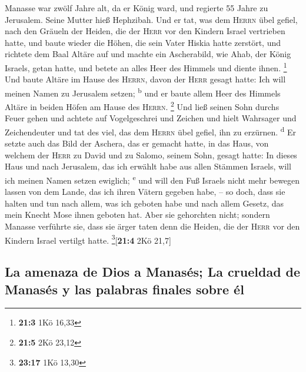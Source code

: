  Manasse war zwölf Jahre alt, da er König ward, und
regierte 55 Jahre zu Jerusalem. Seine Mutter hieß Hephzibah.
 Und er tat, was dem \textsc{Herrn} übel gefiel, nach den
Gräueln der Heiden, die der \textsc{Herr} vor den Kindern Israel
vertrieben hatte,  und baute wieder die Höhen, die sein
Vater Hiskia hatte zerstört, und richtete dem Baal Altäre auf und machte
ein Ascherabild, wie Ahab, der König Israels, getan hatte, und betete an
alles Heer des Himmels und diente ihnen. \footnote{\textbf{21:3} 1Kö
  16,33}  Und baute Altäre im Hause des \textsc{Herrn},
davon der \textsc{Herr} gesagt hatte: Ich will meinen Namen zu Jerusalem
setzen; \textsuperscript{b}  und er baute allem Heer des
Himmels Altäre in beiden Höfen am Hause des \textsc{Herrn}. \footnote{\textbf{21:5}
  2Kö 23,12}  Und ließ seinen Sohn durchs Feuer gehen und
achtete auf Vogelgeschrei und Zeichen und hielt Wahrsager und
Zeichendeuter und tat des viel, das dem \textsc{Herrn} übel gefiel, ihn
zu erzürnen. \textsuperscript{d}  Er setzte auch das Bild
der Aschera, das er gemacht hatte, in das Haus, von welchem der
\textsc{Herr} zu David und zu Salomo, seinem Sohn, gesagt hatte: In
dieses Haus und nach Jerusalem, das ich erwählt habe aus allen Stämmen
Israels, will ich meinen Namen setzen ewiglich; \textsuperscript{e}
 und will den Fuß Israels nicht mehr bewegen lassen von
dem Lande, das ich ihren Vätern gegeben habe, -- so doch, dass sie
halten und tun nach allem, was ich geboten habe und nach allem Gesetz,
das mein Knecht Mose ihnen geboten hat.  Aber sie
gehorchten nicht; sondern Manasse verführte sie, dass sie ärger taten
denn die Heiden, die der \textsc{Herr} vor den Kindern Israel vertilgt
hatte. \footnote{\textbf{23:17} 1Kö 13,30}{[}\textbf{21:4} 2Kö 21,7{]}

\hypertarget{la-amenaza-de-dios-a-manasuxe9s-la-crueldad-de-manasuxe9s-y-las-palabras-finales-sobre-uxe9l}{%
\subsection{La amenaza de Dios a Manasés; La crueldad de Manasés y las
palabras finales sobre
él}\label{la-amenaza-de-dios-a-manasuxe9s-la-crueldad-de-manasuxe9s-y-las-palabras-finales-sobre-uxe9l}}

